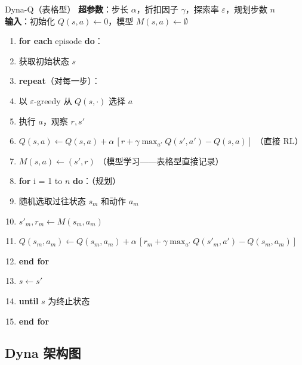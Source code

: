 \begin{myalgorithm}{Dyna-Q（表格型）}
\textbf{超参数}：步长 $\alpha$，折扣因子 $\gamma$，探索率 $\varepsilon$，规划步数 $n$\\
\textbf{输入}：初始化 $Q(s,a) \leftarrow 0$，模型 $M(s,a) \leftarrow \emptyset$
\begin{enumerate}
    \item \textbf{for each} episode \textbf{do}：
    \item \quad 获取初始状态 $s$
    \item \quad \textbf{repeat}（对每一步）：
    \item \quad \quad 以 $\varepsilon$-greedy 从 $Q(s, \cdot)$ 选择 $a$
    \item \quad \quad 执行 $a$，观察 $r, s'$
    \item \quad \quad $Q(s,a) \leftarrow Q(s,a) + \alpha\,[r + \gamma \max_{a'} Q(s',a') - Q(s,a)]$ \quad（直接 RL）
    \item \quad \quad $M(s,a) \leftarrow (s', r)$ \quad（模型学习——表格型直接记录）
    \item \quad \quad \textbf{for} i = 1 to $n$ \textbf{do}：\quad（规划）
    \item \quad \quad \quad 随机选取过往状态 $s_m$ 和动作 $a_m$
    \item \quad \quad \quad $s'_m, r_m \leftarrow M(s_m, a_m)$
    \item \quad \quad \quad $Q(s_m, a_m) \leftarrow Q(s_m, a_m) + \alpha\,[r_m + \gamma \max_{a'} Q(s'_m, a') - Q(s_m, a_m)]$
    \item \quad \quad \textbf{end for}
    \item \quad \quad $s \leftarrow s'$
    \item \quad \textbf{until} $s$ 为终止状态
    \item \textbf{end for}
\end{enumerate}
\end{myalgorithm}

\subsection{Dyna 架构图}

